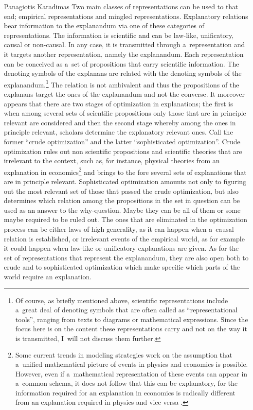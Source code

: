 \begin{artengenv}{Panagiotis Karadimas}
Two main classes of representations can be used to that end; empirical representations and mingled representations. Explanatory relations bear information to the explanandum via one of these categories of representations. The information is scientific and can be law-like, unificatory, causal or non-causal. In any case, it is transmitted through a~representation and it targets another representation, namely the explanandum. Each representation can be conceived as a~set of propositions that carry scientific information. The denoting symbols of the explanans are related with the denoting symbols of the explanandum.\footnote{Of course, as briefly mentioned above, scientific representations include a~great deal of denoting symbols that are often called as ``representational tools'', ranging from texts to diagrams or mathematical expressions. Since the focus here is on the content these representations carry and not on the way it is transmitted, I~will not discuss them further.} The relation is not ambivalent and thus the propositions of the explanans target the ones of the explanandum and not the converse. It moreover appears that there are two stages of optimization in explanations; the first is when among several sets of scientific propositions only those that are in principle relevant are considered and then the second stage whereby among the ones in principle relevant, scholars determine the explanatory relevant ones. Call the former ``crude optimization'' and the latter ``sophisticated optimization''. Crude optimization rules out non scientific propositions and scientific theories that are irrelevant to the context, such as, for instance, physical theories from an explanation in economics\footnote{Some current trends in modeling strategies work on the assumption that a~unified mathematical picture of events in physics and economics is possible. However, even if a~mathematical representation of these events can appear in a~common schema, it does not follow that this can be explanatory, for the information required for an explanation in economics is radically different from an explanation required in physics and vice versa
\parencite[][p.125]{woodward_unificationism_2016}.%
} and brings to the fore several sets of explanations that are in principle relevant. Sophisticated optimization amounts not only to figuring out the most relevant set of those that passed the crude optimization, but also determines which relation among the propositions in the set in question can be used as an answer to the why-question. Maybe they can be all of them or some maybe required to be ruled out. The ones that are eliminated in the optimization process can be either laws of high generality, as it can happen when a~causal relation is established, or irrelevant events of the empirical world, as for example it could happen when law-like or unificatory explanations are given. As for the set of representations that represent the explanandum, they are also open both to crude and to sophisticated optimization which make specific which parts of the world require an explanation.


\end{artengenv}
